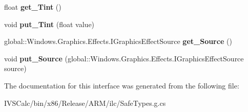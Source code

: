 \begin{DoxyCompactItemize}
float {\bfseries get\+\_\+\+Tint} ()
\item 
\mbox{\label{interface_microsoft_1_1_graphics_1_1_canvas_1_1_effects_1_1_i_temperature_and_tint_effect_a6de0c0063e0a4554bb5a7c590e37966b}} 
void {\bfseries put\+\_\+\+Tint} (float value)
\item 
\mbox{\label{interface_microsoft_1_1_graphics_1_1_canvas_1_1_effects_1_1_i_temperature_and_tint_effect_a193a544f1bcaed2247fe83207e320a69}} 
global\+::\+Windows.\+Graphics.\+Effects.\+I\+Graphics\+Effect\+Source {\bfseries get\+\_\+\+Source} ()
\item 
\mbox{\label{interface_microsoft_1_1_graphics_1_1_canvas_1_1_effects_1_1_i_temperature_and_tint_effect_a8bb22acb219949af2af4ec2202ff8e1f}} 
void {\bfseries put\+\_\+\+Source} (global\+::\+Windows.\+Graphics.\+Effects.\+I\+Graphics\+Effect\+Source source)
\end{DoxyCompactItemize}


The documentation for this interface was generated from the following file\+:\begin{DoxyCompactItemize}
\item 
I\+V\+S\+Calc/bin/x86/\+Release/\+A\+R\+M/ilc/Safe\+Types.\+g.\+cs\end{DoxyCompactItemize}
